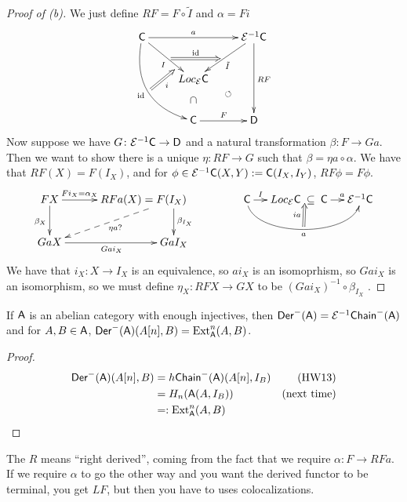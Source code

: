 \begin{proof}[Proof of (b)]
 We just define $RF=F\circ \tilde I$ and $\alpha = Fi$
 \[\xymatrix{
  \C \ar@/_5ex/[ddr]^{}="c"_\id \ar[dr]_I_(.7){}="d"^{}="a" \ar[rr]^-a & & \E^{-1}\C\ar[dl]^{\tilde I}_{}="b" \ar[dd]^{RF}\\
  & Loc_\E \C \ar@{}[d]|{\mbox{$\cap$}} \ar@{}[dr]^\circlearrowleft\\
  & \C\ar[r]^F & \D
  \ar@{=>}^\id "a";"b"
  \ar@{=>}_i "c";"d"
 }\]
 Now suppose we have $G\colon \mathcal{E}^{-1}\text{\sf C}\to \text{\sf D}$ and a natural transformation $\beta\colon F\to Ga$. Then we want to show there is a unique $\eta\colon RF\to G$ such that $\beta=\eta a \circ \alpha$. We have that $RF(X)=F(I_X)$, and for $\phi\in \mathcal{E}^{-1}\text{\sf C}(X,Y):=\text{\sf C}(I_X,I_Y)$, $RF\phi=F\phi$.
 \[\xymatrix @C+3pc{
  FX \ar[r]^-{Fi_X=\alpha_X}\ar[d]_{\beta_X} & **[l] RF a(X)=F(I_X)\!\!\!\! \ar[d]^{\beta_{I_X}} \ar@{-->}[dl]^{\eta a?}\\
  Ga X \ar[r]_{Ga i_X} & Ga I_X
 }\qquad\qquad
 \xymatrix@C-1pc{
  \C \ar@(d,d)[rrr]_a^{}="a" \ar[r]^-I & Loc_\E \C \ar@{}[r]|-{\mbox{$\subseteq$}}_{}="b" & \C\ar[r]^a & \E^{-1}\C
  \ar@{=>}^{ia} "a";"b"
 }\]
 We have that $i_X\colon X\to I_X$ is an equivalence, so $ai_X$ is an isomoprhism, so $Gai_X$ is an isomorphism, so we must define $\eta_X\colon RF X\to GX$ to be $(Gai_X)^{-1}\circ \beta_{I_X}$ .
\end{proof}
\begin{corollary}
 If $\text{\sf A}$ is an abelian category with enough injectives, then $\operatorname{\sf Der}^-(\text{\sf A})=\mathcal{E}^{-1}\text{\sf Chain}^-(\text{\sf A})$ and for $A,B\in \text{\sf A}$, $\operatorname{\sf Der}^-(\text{\sf A})(A[n],B) = \operatorname{Ext}^n_{\text{\sf A}}(A,B)$. 
\end{corollary}
\begin{proof}
 \begin{align*}
  \operatorname{\sf Der}^-(\text{\sf A})(A[n],B) &= h\text{\sf Chain}^-(\text{\sf A})(A[n],I_B) & \text{(HW13)}\\
  &= H_n(\text{\sf A}(A,I_B)) & \text{(next time)}\\
  &=: \operatorname{Ext}^n_{\text{\sf A}}(A,B)
 \end{align*}
\end{proof}
\begin{remark}
 The $R$ means ``right derived'', coming from the fact that we require $\alpha\colon F\to RF a$. If we require $\alpha$ to go the other way and you want the derived functor to be terminal, you get $LF$, but then you have to uses colocalizations.
\end{remark}






